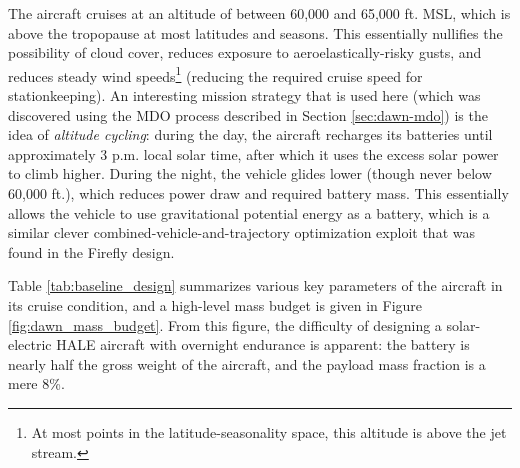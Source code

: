 The aircraft cruises at an altitude of between 60,000 and 65,000 ft. MSL, which is above the tropopause at most latitudes and seasons. This essentially nullifies the possibility of cloud cover, reduces exposure to aeroelastically-risky gusts, and reduces steady wind speeds\footnote{At most points in the latitude-seasonality space, this altitude is above the jet stream.} (reducing the required cruise speed for stationkeeping). An interesting mission strategy that is used here (which was discovered using the MDO process described in Section \ref{sec:dawn-mdo}) is the idea of \emph{altitude cycling}: during the day, the aircraft recharges its batteries until approximately 3 p.m. local solar time, after which it uses the excess solar power to climb higher. During the night, the vehicle glides lower (though never below 60,000 ft.), which reduces power draw and required battery mass. This essentially allows the vehicle to use gravitational potential energy as a battery, which is a similar clever combined-vehicle-and-trajectory optimization exploit that was found in the Firefly design.

Table \ref{tab:baseline_design} summarizes various key parameters of the aircraft in its cruise condition, and a high-level mass budget is given in Figure \ref{fig:dawn_mass_budget}. From this figure, the difficulty of designing a solar-electric HALE aircraft with overnight endurance is apparent: the battery is nearly half the gross weight of the aircraft, and the payload mass fraction is a mere 8\%.


